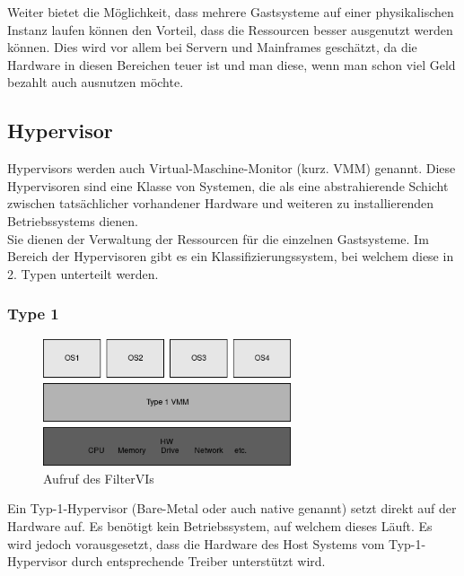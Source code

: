 \documentclass[14pt]{extreport}
\begin{document}
Weiter bietet die Möglichkeit, dass mehrere Gastsysteme auf einer physikalischen Instanz laufen können den Vorteil, dass die Ressourcen besser ausgenutzt werden können. Dies wird vor allem bei Servern und Mainframes geschätzt, da die Hardware in diesen Bereichen teuer ist und man diese, wenn man schon viel Geld bezahlt auch ausnutzen möchte.
\subsection{Hypervisor}
Hypervisors werden auch Virtual-Maschine-Monitor (kurz. VMM) genannt. Diese Hypervisoren sind eine Klasse von Systemen, die als eine abstrahierende Schicht zwischen tatsächlicher vorhandener Hardware und weiteren zu installierenden Betriebssystems dienen.\\
Sie dienen der Verwaltung der Ressourcen für die einzelnen Gastsysteme.
Im Bereich der Hypervisoren gibt es ein Klassifizierungssystem, bei welchem diese in 2. Typen unterteilt werden.
\subsubsection{Type 1}
\begin{figure}
	\begin{center}
		\includegraphics[width=0.65\textwidth]{png/VMMType1.png}
		\caption{Aufruf des FilterVIs}
		\label{fig:filterVI}
	\end{center}
\end{figure}
Ein Typ-1-Hypervisor (Bare-Metal oder auch native genannt) setzt direkt auf der Hardware auf. Es benötigt kein Betriebssystem, auf welchem dieses Läuft. Es wird jedoch vorausgesetzt, dass die Hardware des Host Systems vom Typ-1-Hypervisor durch entsprechende Treiber unterstützt wird.\\

\newpage
\end{document}
